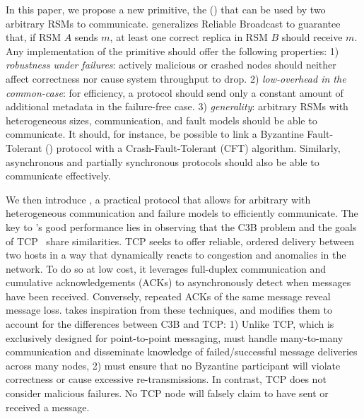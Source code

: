 In this paper, we propose a new primitive, the \CCCFull{} (\CCC{}) that can be used by two arbitrary RSMs to communicate. \CCC{} generalizes Reliable Broadcast to guarantee that, if RSM $A$ sends $m$, at least one correct replica in RSM $B$ should receive $m$. Any implementation of the \CCC{} primitive should offer the following properties:  1) \textit{robustness under failures}:  actively malicious or crashed nodes should neither affect correctness nor cause system throughput to drop.
2) \textit{low-overhead in the common-case}: for efficiency, a \CCC{} protocol should send only a constant amount of additional metadata in the failure-free case. 
3) \textit{generality}: arbitrary RSMs with heterogeneous sizes, communication, and fault models should be able to communicate. It should, for instance, be possible to link a Byzantine Fault-Tolerant (\BFT)  protocol with a Crash-Fault-Tolerant (CFT) algorithm. Similarly, asynchronous and partially synchronous protocols should also be able to communicate effectively.


We then introduce \Scrooge{}, a practical \CCC{} protocol that allows for arbitrary  with heterogeneous communication and failure models to efficiently communicate. The key to \Scrooge{}'s good performance lies in observing that the C3B problem and the goals of TCP~\cite{computer-networks-book} share similarities. TCP seeks to offer reliable, ordered delivery between two hosts in a way that dynamically reacts to congestion and anomalies in the network. To do so at low cost, it leverages full-duplex communication and cumulative acknowledgements (ACKs) to asynchronously detect when messages have been received. Conversely, repeated ACKs of the same message reveal message loss. \Scrooge{} takes inspiration from these techniques, and modifies them to account for the differences between C3B and TCP: 
1) Unlike TCP, which is exclusively designed for point-to-point messaging, \Scrooge{} must handle many-to-many communication and 
disseminate knowledge of failed/successful message deliveries across many nodes, 
2) \Scrooge{} must ensure that no Byzantine participant will violate correctness or cause excessive re-transmissions. In contrast, TCP does not consider malicious failures. No TCP node will falsely claim to have sent or received a message.


 

